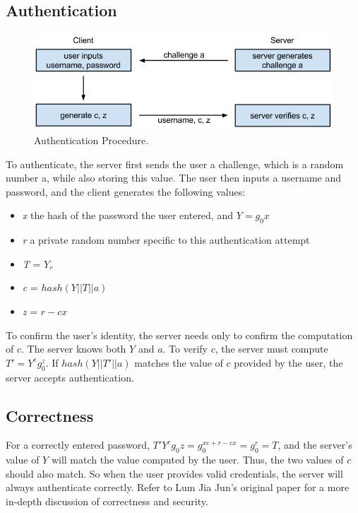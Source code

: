 \documentclass[11pt]{article}
\begin{document}
\subsection{Authentication}
\begin{figure}[h]
  \centering
\includegraphics[scale=0.65]{auth.png}

 \caption{Authentication Procedure.}
 \label{fig:authentication}
\end{figure}

To authenticate, the server first sends the user a challenge, which is a random number a, while also storing this value.  The user then inputs a username and password, and the client generates the following values:
\begin{itemize}
  \item {\em x} the hash of the password the user entered, and $Y = g_0x$
  \item {\em r} a private random number specific to this authentication attempt
  \item {\em T} = $Y_r$
  \item {\em c} = $hash(Y || T || a)$
  \item {\em z} = $r - cx$
    
\end{itemize}

To confirm the user’s identity, the server needs only to confirm the computation of $c$.  The server knows both $Y$ and $a$.  To verify $c$, the server must compute $T' = Y^cg_0^z$.  If $hash(Y || T' || a)$ matches the value of $c$ provided by the user, the server accepts authentication.

\subsection{Correctness}

For a correctly entered password, $T' Y^cg_0z = g_0^{xc + r - cx} = g_0^r = T$, and the server’s value of $Y$ will match the value computed by the user.  Thus, the two values of $c$ should also match.  So when the user provides valid credentials, the server will always authenticate correctly.  Refer to Lum Jia Jun’s original paper for a more in-depth discussion of correctness and security.
\end{document}
